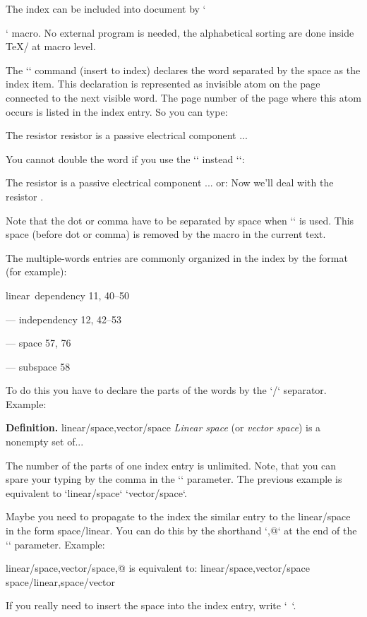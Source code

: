 The index can be included into document by `\makeindex` macro. No external
program is needed, the alphabetical sorting are done inside \TeX/ at macro
level.

The `\ii` command (insert to index) declares the word separated by the space
as the index item. This declaration is represented as invisible atom on the
page connected to the next visible word. The page number of the page where
this atom occurs is listed in the index entry. So you can type:

\begtt
The \ii resistor resistor is a passive electrical component ...
\endtt

You cannot double the word if you use the `\iid` instead `\ii`:

\begtt
The \iid resistor is a passive electrical component ...
or:
Now we'll deal with the \iid resistor .
\endtt

Note that the dot or comma have to be separated by space when `\iid` is
used. This space (before dot or comma) is removed by the macro in 
the current text.

The multiple-words entries are commonly organized in the index by the format
(for example): 

\medskip

linear~dependency  11, 40--50

--- independency 12, 42--53

--- space 57, 76

--- subspace 58

\medskip

To do this you have to declare the parts of the words by the `/` separator.
Example:

\begtt
{\bf Definition.}
\ii linear/space,vector/space
{\em Linear space} (or {\em vector space}) is a nonempty set of...
\endtt

The number of the parts of one index entry is unlimited. Note, that you can
spare your typing by the comma in the `\ii` parameter. The previous example
is equivalent to `\ii linear/space` `\ii vector/space`.

Maybe you need to propagate to the index the similar entry to the
linear/space in the form space/linear. You can do this by the shorthand `,@`
at the end of the `\ii` parameter. Example:

\begtt
\ii linear/space,vector/space,@
is equivalent to:
\ii linear/space,vector/space \ii space/linear,space/vector
\endtt

If you really need to insert the space into the index entry, write `~`.

